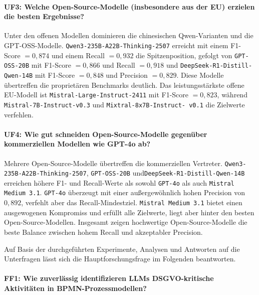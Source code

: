 \paragraph{UF3: Welche Open-Source-Modelle (insbesondere aus der EU) erzielen die besten Ergebnisse?}

Unter den offenen Modellen dominieren die chinesischen Qwen-Varianten und die GPT-OSS-Modelle. \texttt{Qwen3-235B-A22B-Thinking-2507} erreicht mit einem F1-Score $= 0{,}874$ und einem Recall $= 0{,}932$ die Spitzenposition, gefolgt von \texttt{GPT-OSS-20B} mit F1-Score $= 0{,}866$ und Recall $= 0{,}918$ und \texttt{DeepSeek-R1-Distill-Qwen-14B} mit F1-Score $= 0{,}848$ und Precision $= 0{,}829$. Diese Modelle übertreffen die proprietären Benchmarks deutlich. Das leistungsstärkste offene \ac{EU}-Modell ist \texttt{Mistral-Large-Instruct-2411} mit F1-Score $= 0{,}823$, während \texttt{Mistral-7B-Instruct-v0.3} und \texttt{Mixtral-8x7B-Instruct-\linebreak~v0.1} die Zielwerte verfehlen.

\paragraph{UF4: Wie gut schneiden Open-Source-Modelle gegenüber kommerziellen Modellen wie GPT-4o ab?}

Mehrere Open-Source-Modelle übertreffen die kommerziellen Vertreter. \texttt{Qwen3-235B-A22B-Thinking-2507}, \texttt{GPT-OSS-20B} und\linebreak\texttt{DeepSeek-R1-Distill-Qwen-14B} erreichen höhere F1- und Recall-Werte als sowohl \texttt{GPT-4o} als auch \texttt{Mistral Medium 3.1}. \texttt{GPT-4o} überzeugt mit einer außergewöhnlich hohen Precision von $0{,}892$, verfehlt aber das Recall-Mindestziel. \texttt{Mistral Medium 3.1} bietet einen ausgewogenen Kompromiss und erfüllt alle Zielwerte, liegt aber hinter den besten Open-Source-Modellen. Insgesamt zeigen hochwertige Open-Source-Modelle die beste Balance zwischen hohem Recall und akzeptabler Precision.

Auf Basis der durchgeführten Experimente, Analysen und Antworten auf die Unterfragen lässt sich die Hauptforschungsfrage im Folgenden beantworten.

\paragraph{FF1: Wie zuverlässig identifizieren \acp{LLM} DSGVO-kritische Aktivitäten in BPMN-Prozessmodellen?}

